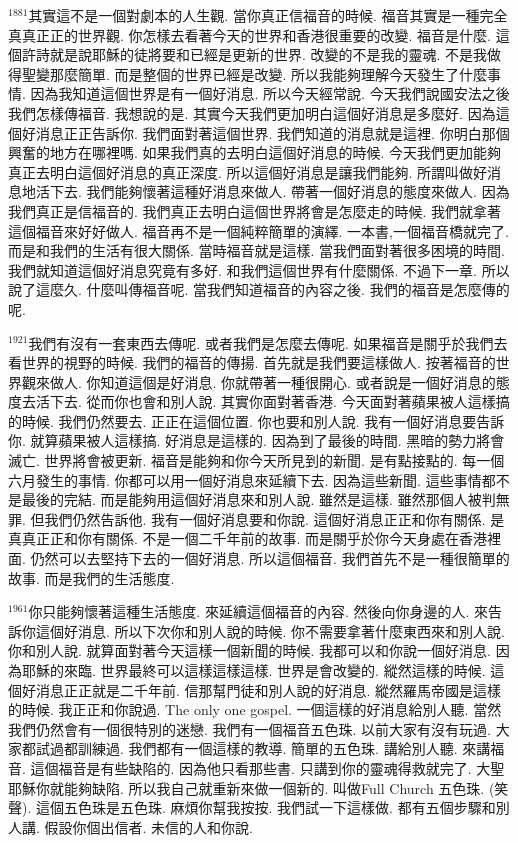 \documentclass{book}
\begin{document}
$^{1881}$其實這不是一個對劇本的人生觀.
當你真正信福音的時候.
福音其實是一種完全真真正正的世界觀.
你怎樣去看著今天的世界和香港很重要的改變.
福音是什麼.
這個許詩就是說耶穌的徒將要和已經是更新的世界.
改變的不是我的靈魂.
不是我做得聖變那麼簡單.
而是整個的世界已經是改變.
所以我能夠理解今天發生了什麼事情.
因為我知道這個世界是有一個好消息.
所以今天經常說.
今天我們說國安法之後我們怎樣傳福音.
我想說的是.
其實今天我們更加明白這個好消息是多麼好.
因為這個好消息正正告訴你.
我們面對著這個世界.
我們知道的消息就是這裡.
你明白那個興奮的地方在哪裡嗎.
如果我們真的去明白這個好消息的時候.
今天我們更加能夠真正去明白這個好消息的真正深度.
所以這個好消息是讓我們能夠.
所謂叫做好消息地活下去.
我們能夠懷著這種好消息來做人.
帶著一個好消息的態度來做人.
因為我們真正是信福音的.
我們真正去明白這個世界將會是怎麼走的時候.
我們就拿著這個福音來好好做人.
福音再不是一個純粹簡單的演繹.
一本書,一個福音橋就完了.
而是和我們的生活有很大關係.
當時福音就是這樣.
當我們面對著很多困境的時間.
我們就知道這個好消息究竟有多好.
和我們這個世界有什麼關係.
不過下一章.
所以說了這麼久.
什麼叫傳福音呢.
當我們知道福音的內容之後.
我們的福音是怎麼傳的呢.

$^{1921}$我們有沒有一套東西去傳呢.
或者我們是怎麼去傳呢.
如果福音是關乎於我們去看世界的視野的時候.
我們的福音的傳揚.
首先就是我們要這樣做人.
按著福音的世界觀來做人.
你知道這個是好消息.
你就帶著一種很開心.
或者說是一個好消息的態度去活下去.
從而你也會和別人說.
其實你面對著香港.
今天面對著蘋果被人這樣搞的時候.
我們仍然要去.
正正在這個位置.
你也要和別人說.
我有一個好消息要告訴你.
就算蘋果被人這樣搞.
好消息是這樣的.
因為到了最後的時間.
黑暗的勢力將會滅亡.
世界將會被更新.
福音是能夠和你今天所見到的新聞.
是有點接點的.
每一個六月發生的事情.
你都可以用一個好消息來延續下去.
因為這些新聞.
這些事情都不是最後的完結.
而是能夠用這個好消息來和別人說.
雖然是這樣.
雖然那個人被判無罪.
但我們仍然告訴他.
我有一個好消息要和你說.
這個好消息正正和你有關係.
是真真正正和你有關係.
不是一個二千年前的故事.
而是關乎於你今天身處在香港裡面.
仍然可以去堅持下去的一個好消息.
所以這個福音.
我們首先不是一種很簡單的故事.
而是我們的生活態度.

$^{1961}$你只能夠懷著這種生活態度.
來延續這個福音的內容.
然後向你身邊的人.
來告訴你這個好消息.
所以下次你和別人說的時候.
你不需要拿著什麼東西來和別人說.
你和別人說.
就算面對著今天這樣一個新聞的時候.
我都可以和你說一個好消息.
因為耶穌的來臨.
世界最終可以這樣這樣這樣.
世界是會改變的.
縱然這樣的時候.
這個好消息正正就是二千年前.
信那幫門徒和別人說的好消息.
縱然羅馬帝國是這樣的時候.
我正正和你說過.
The only one gospel.
一個這樣的好消息給別人聽.
當然我們仍然會有一個很特別的迷戀.
我們有一個福音五色珠.
以前大家有沒有玩過.
大家都試過都訓練過.
我們都有一個這樣的教導.
簡單的五色珠.
講給別人聽.
來講福音.
這個福音是有些缺陷的.
因為他只看那些書.
只講到你的靈魂得救就完了.
大聖耶穌你就能夠缺陷.
所以我自己就重新來做一個新的.
叫做Full Church 五色珠.
(笑聲).
這個五色珠是五色珠.
麻煩你幫我按按.
我們試一下這樣做.
都有五個步驟和別人講.
假設你個出信者.
未信的人和你說.
\end{document}
